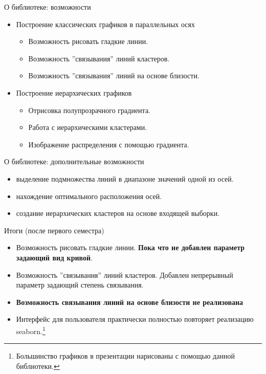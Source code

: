 \documentclass[fleqn, xcolor=x11names]{beamer}
\begin{document}
\begin{frame}{О библиотеке: возможности}
    \begin{itemize}
        \item Построение классических графиков в параллельных осях
        \begin{itemize}
            \item Возможность рисовать гладкие линии.
            \item Возможность ''связывания'' линий кластеров.
            \item Возможность ''связывания'' линий на основе близости. 
        \end{itemize}
        \vspace{10px}
        \item Построение иерархических графиков
        \begin{itemize}
            \item Отрисовка полупрозрачного градиента.
            \item Работа с иерархическими кластерами.
            \item Изображение распределения с помощью градиента.
        \end{itemize}
    \end{itemize}
\end{frame}

\begin{frame}{О библиотеке: дополнительные возможности}
    \begin{itemize}
        \item выделение подмножества линий в  диапазоне значений одной из осей.
        \item нахождение оптимального расположения осей.
        \item создание иерархических кластеров на основе входящей выборки.
    \end{itemize}
\end{frame}

\begin{frame}{Итоги (после первого семестра)}
    \begin{itemize}
        \item Возможность рисовать гладкие линии. \textbf{Пока что не добавлен параметр задающий вид кривой}.
        \item Возможность ''связывания'' линий кластеров. 
        Добавлен непрерывный параметр задающий степень связывания.
        \item \textbf{Возможность связывания линий на основе близости не реализована}
        \item Интерфейс для пользователя практически полностью повторяет реализацию seaborn.\footnote{
            Большинство графиков в презентации нарисованы с помощью данной библиотеки.}
    \end{itemize}
\end{frame}
\end{document}
